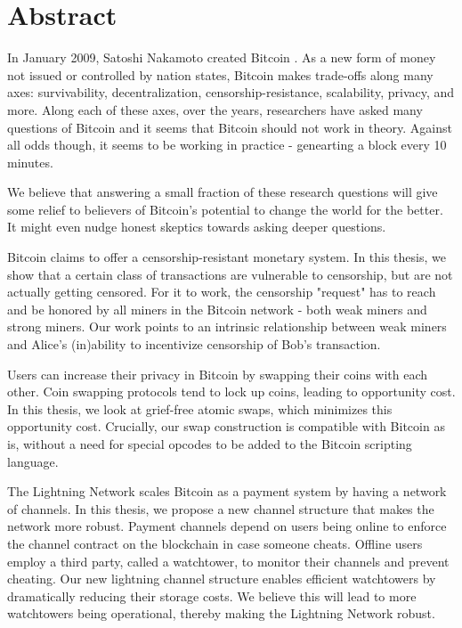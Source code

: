 
\chapter*{Abstract}

In January 2009, Satoshi Nakamoto created Bitcoin \cite{bitcoin_whitepaper}. As a new form of money not issued or controlled by nation states, Bitcoin makes trade-offs along many axes: survivability, decentralization, censorship-resistance, scalability, privacy, and more. Along each of these axes, over the years, researchers have asked many questions of Bitcoin and it seems that Bitcoin should not work in theory. Against all odds though, it seems to be working in practice - genearting a block every 10 minutes.

We believe that answering a small fraction of these research questions will give some relief to believers of Bitcoin's potential to change the world for the better. It might even nudge honest skeptics towards asking deeper questions.

Bitcoin claims to offer a censorship-resistant monetary system. In this thesis, we show that a certain class of transactions are vulnerable to censorship, but are not actually getting censored. For it to work, the censorship "request" has to reach and be honored by all miners in the Bitcoin network - both weak miners and strong miners. Our work points to an intrinsic relationship between weak miners and Alice's (in)ability to incentivize censorship of Bob's transaction.

Users can increase their privacy in Bitcoin by swapping their coins with each other. Coin swapping protocols tend to lock up coins, leading to opportunity cost. In this thesis, we look at grief-free atomic swaps, which minimizes this opportunity cost. Crucially, our swap construction is compatible with Bitcoin as is, without a need for special opcodes to be added to the Bitcoin scripting language.

The Lightning Network scales Bitcoin as a payment system by having a network of channels. In this thesis, we propose a new channel structure that makes the network more robust. Payment channels depend on users being online to enforce the channel contract on the blockchain in case someone cheats. Offline users employ a third party, called a watchtower, to monitor their channels and prevent cheating. Our new lightning channel structure enables efficient watchtowers by dramatically reducing their storage costs. We believe this will lead to more watchtowers being operational, thereby making the Lightning Network robust.

